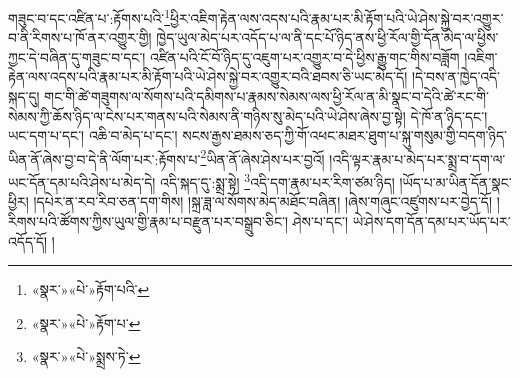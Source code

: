 གཟུང་བ་དང་འཛིན་པ་:རྟོགས་པའི་\footnote{«སྣར་»«པེ་»རྟོག་པའི་}ཕྱིར་འཇིག་རྟེན་ལས་འདས་པའི་རྣམ་པར་མི་རྟོག་པའི་ཡེ་ཤེས་སྐྱེ་བར་འགྱུར་བ་ནི་རིགས་པ་ཁོ་ནར་འགྱུར་གྱི། ཁྱེད་ཡུལ་མེད་པར་འདོད་པ་ལ་ནི་དང་པོ་ཉིད་ནས་ཕྱི་རོལ་གྱི་དོན་མེད་ལ་ཕྱིས་ཀྱང་དེ་བཞིན་དུ་གཟུང་བ་དང་། འཛིན་པའི་ངོ་བོ་ཉིད་དུ་འཇུག་པར་འགྱུར་བ་དེ་ཕྱིས་རྒྱུ་གང་གིས་བཟློག །འཇིག་རྟེན་ལས་འདས་པའི་རྣམ་པར་མི་རྟོག་པའི་ཡེ་ཤེས་སྐྱེ་བར་འགྱུར་བའི་ཐབས་ཅི་ཡང་མེད་དོ། །དེ་བས་ན་ཁྱེད་འདི་སྐད་དུ། གང་གི་ཚེ་གཟུགས་ལ་སོགས་པའི་དམིགས་པ་རྣམས་སེམས་ལས་ཕྱི་རོལ་ན་མི་སྣང་བ་དེའི་ཚེ་རང་གི་སེམས་ཀྱི་ཆོས་ཉིད་ལ་ངེས་པར་གནས་པའི་སེམས་ནི་གཉིས་སུ་མེད་པའི་ཡེ་ཤེས་ཞེས་བྱ་སྟེ། དེ་ཁོ་ན་ཉིད་དང་། ཡང་དག་པ་དང་། འཆི་བ་མེད་པ་དང་། སངས་རྒྱས་ཐམས་ཅད་ཀྱི་གོ་འཕང་མཐར་ཐུག་པ་སྐུ་གསུམ་གྱི་བདག་ཉིད་ཡིན་ནོ་ཞེས་བྱ་བ་དེ་ནི་ལོག་པར་:རྟོགས་པ་\footnote{«སྣར་»«པེ་»རྟོག་པ་}ཡིན་ནོ་ཞེས་ཤེས་པར་བྱའོ། །འདི་ལྟར་རྣམ་པ་མེད་པར་སྨྲ་བ་དག་ལ་ཡང་དོན་དམ་པའི་ཤེས་པ་མེད་དེ། འདི་སྐད་དུ་:སྨྲ་སྟེ། \footnote{«སྣར་»«པེ་»སྨྲས་ཏེ་}འདི་དག་རྣམ་པར་རིག་ཙམ་ཉིད། །ཡོད་པ་མ་ཡིན་དོན་སྣང་ཕྱིར། །དཔེར་ན་རབ་རིབ་ཅན་དག་གིས། །སྐྲ་ཟླ་ལ་སོགས་མེད་མཐོང་བཞིན། །ཞེས་གཞུང་འཛུགས་པར་བྱེད་དོ། །རིགས་པའི་ཚོགས་ཀྱིས་ཡུལ་གྱི་རྣམ་པ་བརྫུན་པར་བསྒྲུབ་ཅིང་། ཤེས་པ་དང་། ཡེ་ཤེས་དག་དོན་དམ་པར་ཡོད་པར་འདོད་དོ། །
